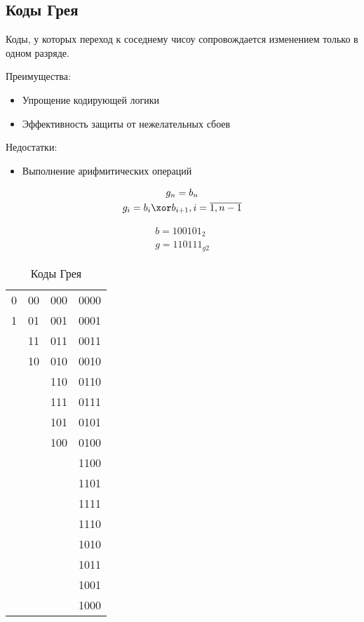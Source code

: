 \subsection{Коды Грея}

\begin{definition}
  Коды, у которых переход к соседнему чисоу сопровождается изменением только в одном разряде.
\end{definition}

Преимущества:
\begin{itemize}
  \item Упрощение кодирующей логики
  \item Эффективность защиты от нежелательных сбоев
\end{itemize}

Недостатки:
\begin{itemize}
  \item Выполнение арифмитических операций
\end{itemize}

\begin{gather*}
  g_n = b_n \\
  g_i = b_i \xor b_{i+1}, i = \overline{1, n-1}
\end{gather*}
\begin{eg}
  \begin{gather*}
    b = 100101_2 \\
    g = 110111_{g2}
  \end{gather*}
\end{eg}

\begin{table}[htpb]
  \centering
  \caption{Коды Грея}
  \begin{tabular}{ | c | c | c | c |}
  \hline
  0 & 00 & 000 & 0000 \\
  1 & 01 & 001 & 0001 \\
    & 11 & 011 & 0011 \\
    & 10 & 010 & 0010 \\
    &    & 110 & 0110 \\
    &    & 111 & 0111 \\
    &    & 101 & 0101 \\
    &    & 100 & 0100 \\
    &    &     & 1100 \\
    &    &     & 1101 \\
    &    &     & 1111 \\
    &    &     & 1110 \\
    &    &     & 1010 \\
    &    &     & 1011 \\
    &    &     & 1001 \\
    &    &     & 1000 \\
  \hline
  \end{tabular}
\end{table}

